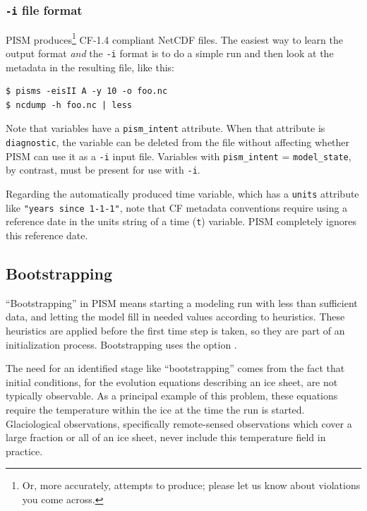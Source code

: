 \documentclass[titlepage,letterpaper,final]{scrartcl}
\begin{document}
\subsubsection*{\texttt{-i} file format}
PISM produces\footnote{Or, more accurately, attempts to produce; please let us know about violations you come across.} CF-1.4 compliant NetCDF files.  The easiest way to learn the output format \emph{and} the \texttt{-i} format is to do a simple run and then look at the metadata in the resulting file, like this:
\begin{verbatim}
$ pisms -eisII A -y 10 -o foo.nc
$ ncdump -h foo.nc | less
\end{verbatim}

Note that variables have a \texttt{pism_intent} attribute.  When that attribute is \texttt{diagnostic}, the variable can be deleted from the file without affecting whether PISM can use it as a \texttt{-i} input file.  Variables with \texttt{pism_intent} = \texttt{model_state}, by contrast, must be present for use with \texttt{-i}.

Regarding the automatically produced time variable, which has a \texttt{units} attribute like \texttt{"years since 1-1-1"}, note that CF metadata conventions require using a reference date in the units string of a time (\texttt{t}) variable.  PISM completely ignores this reference date.


\subsection{Bootstrapping} 

``Bootstrapping'' in PISM means starting a modeling run with less than sufficient data, and letting the model fill in needed values according to heuristics.  These heuristics are applied before the first time step is taken, so they are part of an initialization process.  Bootstrapping uses the option .

The need for an identified stage like ``bootstrapping'' comes from the fact that initial conditions, for the evolution equations describing an ice sheet, are not typically observable.  As a principal example of this problem, these equations require the temperature within the ice at the time the run is started.  Glaciological observations, specifically remote-sensed observations which cover a large fraction or all of an ice sheet, never include this temperature field in practice.
\end{document}

